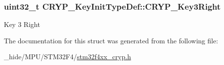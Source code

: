 \subsubsection[{C\+R\+Y\+P\+\_\+\+Key3\+Right}]{\setlength{\rightskip}{0pt plus 5cm}uint32\+\_\+t C\+R\+Y\+P\+\_\+\+Key\+Init\+Type\+Def\+::\+C\+R\+Y\+P\+\_\+\+Key3\+Right}\label{struct_c_r_y_p___key_init_type_def_afc24dd3ea3e7391f62ce4583ab4ae563}
Key 3 Right 

The documentation for this struct was generated from the following file\+:\begin{DoxyCompactItemize}
\item 
\+\_\+hide/\+M\+P\+U/\+S\+T\+M32\+F4/\hyperlink{stm32f4xx__cryp_8h}{stm32f4xx\+\_\+cryp.\+h}\end{DoxyCompactItemize}
